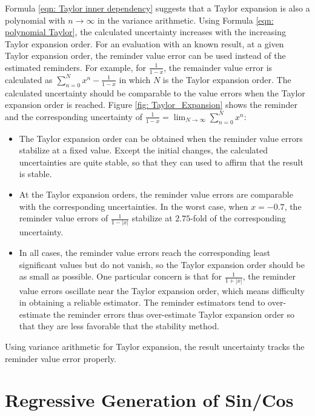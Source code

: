 \documentclass[twoside]{article}
\numberwithin{equation}{section}
\begin{document}
Formula \eqref{eqn: Taylor inner dependency} suggests that a Taylor expansion is also a polynomial with $n \rightarrow \infty$ in the variance arithmetic.
Using Formula \eqref{eqn: polynomial Taylor}, the calculated uncertainty increases with the increasing Taylor expansion order.
For an evaluation with an known result, at a given Taylor expansion order, the reminder value error can be used instead of the estimated reminders. 
For example, for $\frac{1}{1 - x}$, the remainder value error is calculated as $\sum_{n = 0}^{N} x^n - \frac{1}{1 - x}$ in which $N$ is the Taylor expansion order.
The calculated uncertainty should be comparable to the value errors when the Taylor expansion order is reached.
Figure \ref{fig: Taylor_Expansion} shows the reminder and the corresponding uncertainty of $\frac{1}{1 - x} =\lim_{N \rightarrow \infty} \sum_{n = 0}^{N} x^n$:
\begin{itemize}
\item The Taylor expansion order can be obtained when the reminder value errors stabilize at a fixed value.
Except the initial changes, the calculated uncertainties are quite stable, so that they can used to affirm that the result is stable.

\item At the Taylor expansion orders, the reminder value errors are comparable with the corresponding uncertainties.
In the worst case, when $x=-0.7$, the reminder value errors of $\frac{1}{1 - |x|}$ stabilize at $2.75$-fold of the corresponding uncertainty.

\item In all cases, the reminder value errors reach the corresponding least significant values but do not vanish, so the Taylor expansion order should be as small as possible.
One particular concern is that for $\frac{1}{1 + |x|}$, the reminder value errors oscillate near the Taylor expansion order, which means difficulty in obtaining a reliable estimator.
The reminder estimators tend to over-estimate the reminder errors thus over-estimate Taylor expansion order so that they are less favorable that the stability method.
\end{itemize}

Using variance arithmetic for Taylor expansion, the result uncertainty tracks the reminder value error properly.










\clearpage
\section{Regressive Generation of Sin/Cos}
\label{sec: recursion}
\end{document}
